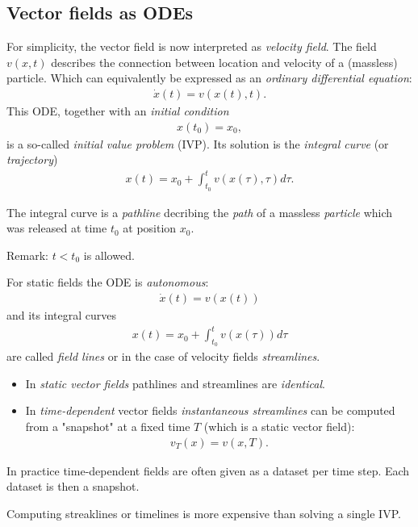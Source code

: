 \subsection{Vector fields as ODEs}
For simplicity, the vector field is now interpreted as \emph{velocity field}. The field $v(x,t)$ describes the connection between location and velocity of a (massless) particle. Which can equivalently be expressed as an \emph{ordinary differential equation}:
\begin{align*}
    \dot x(t) = v(x(t),t).
\end{align*}
This ODE, together with an \emph{initial condition} 
\begin{align*}
    x(t_0) = x_0,
\end{align*}
is a so-called \emph{initial value problem} (IVP). Its solution is the \emph{integral curve} (or \emph{trajectory})
\begin{align*}
    x(t) = x_0 + \int_{t_0}^t v(x(\tau),\tau)d\tau.
\end{align*}

The integral curve is a \emph{pathline} decribing the \emph{path} of a massless \emph{particle} which was released at time $t_0$ at position $x_0$.

Remark: $t<t_0$ is allowed.

For static fields the ODE is \emph{autonomous}:
\begin{align*}
    \dot x (t) = v(x(t))
\end{align*}
and its integral curves
\begin{align*}
    x(t) = x_0 + \int_{t_0}^t v(x(\tau)) d\tau
\end{align*}
are called \emph{field lines} or in the case of velocity fields \emph{streamlines}.

\begin{itemize}
    \item In \emph{static vector fields} pathlines and streamlines are \emph{identical}.
    \item In \emph{time-dependent} vector fields \emph{instantaneous streamlines} can be computed from a "snapshot" at a fixed time $T$ (which is a static vector field):
    \begin{align*}
        v_T (x) = v(x,T).
    \end{align*}
\end{itemize}
In practice time-dependent fields are often given as a dataset per time step. Each dataset is then a snapshot.


Computing streaklines or timelines is more expensive than solving a single IVP.

